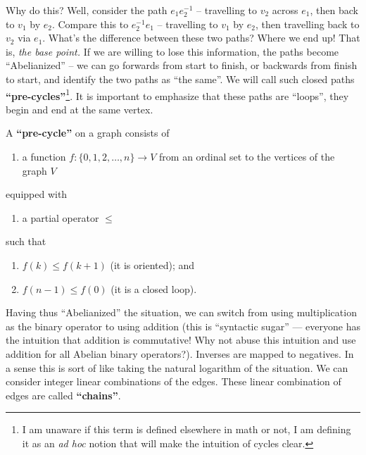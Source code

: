 Why do this? Well, consider the path $e_{1}e_{2}^{-1}$ --
travelling to $v_{2}$ across $e_{1}$, then back to $v_{1}$ by
$e_{2}$. Compare this to $e_{2}^{-1}e_{1}$ -- travelling to
$v_{1}$ by $e_{2}$, then travelling back to $v_{2}$ via
$e_{1}$. What's the difference between these two paths? Where we
end up! That is, \emph{the base point.} If we are willing to lose
this information, the paths become ``Abelianized'' -- we can go
forwards from start to finish, or backwards from finish to start,
and identify the two paths as ``the same''. We will call such
closed paths \textbf{``pre-cycles''}\footnote{I am unaware if this term
  is defined elsewhere in math or not, I am defining it as an
  \emph{ad hoc} notion that will make the intuition of cycles clear.}.
It is important to emphasize that these paths are ``loops'', they
begin and end at the same vertex.

\begin{framed}\begin{defn}%
A \textbf{``pre-cycle''} on a graph consists of
\begin{enumerate}
\item a function $f:\{0,1,2,\ldots,n\}\to V$ from an ordinal set
to the vertices of the graph $V$
\end{enumerate}
equipped with
\begin{enumerate}
\item a partial operator $\leq$
\end{enumerate}
such that\begin{enumerate}
\item $f(k)\leq f(k+1)$ (it is oriented); and
\item $f(n-1)\leq f(0)$ (it is a closed loop).
\end{enumerate}
\end{defn}\end{framed}

Having thus ``Abelianized'' the situation, we can switch from
using multiplication as the binary operator to using addition
(this is ``syntactic sugar'' --- everyone has the intuition that
addition is commutative! Why not abuse this intuition and use
addition for all Abelian binary operators?). Inverses are mapped
to negatives. In a sense this is sort of like taking the natural
logarithm of the situation. We can consider integer linear
combinations of the edges. These linear combination of edges are
called \textbf{``chains''}.


